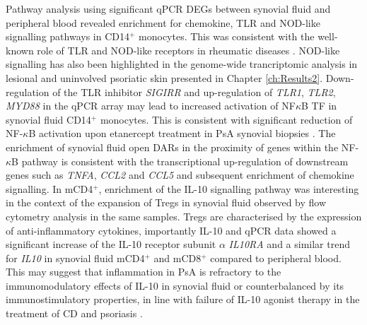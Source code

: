Pathway analysis using significant qPCR DEGs between synovial fluid and peripheral blood revealed enrichment for chemokine, TLR and NOD-like signalling pathways in CD14$^+$ monocytes. This was consistent with the well-known role of TLR and NOD-like receptors in rheumatic diseases \parencite{McCormack2009}. %
NOD-like signalling has also been highlighted in the genome-wide trancriptomic analysis in lesional and uninvolved psoriatic skin presented in Chapter \ref{ch:Results2}. %
Down-regulation of the TLR inhibitor \textit{SIGIRR}  \parencite{Ueno-Shuto2014} and up-regulation of \textit{TLR1}, \textit{TLR2}, \textit{MYD88} in the qPCR array may lead to increased activation of NF$\kappa$B TF in synovial fluid CD14$^+$ monocytes. This is consistent with significant reduction of NF-$\kappa$B activation upon etanercept treatment in PsA synovial biopsies \parencite{Lories2008}. The enrichment of synovial fluid open DARs in the proximity of genes within the NF-$\kappa$B pathway is consistent with the transcriptional up-regulation of downstream genes such as \textit{TNFA}, \textit{CCL2} and \textit{CCL5} and subsequent enrichment of chemokine signalling. In mCD4$^+$, enrichment of the IL-10 signalling pathway was interesting in the context of the expansion of Tregs in synovial fluid observed by flow cytometry analysis in the same samples. Tregs are characterised by the expression of anti-inflammatory cytokines, importantly IL-10 \parencite{Garra2004} and qPCR data showed a significant increase of the IL-10 receptor subunit $\alpha$ \textit{IL10RA} and a similar trend for \textit{IL10} in synovial fluid mCD4$^+$ and mCD8$^+$ compared to peripheral blood. This may suggest that inflammation in PsA is refractory to the immunomodulatory effects of IL-10 in synovial fluid or counterbalanced by its immunostimulatory properties, in line with failure of IL-10 agonist therapy in the treatment of CD and psoriasis \parencite{Marlow2013, Kimball2002}.



